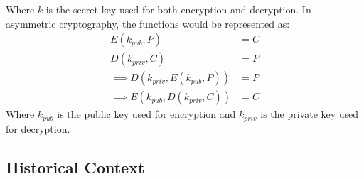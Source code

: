 \documentclass[openany]{book}
\begin{document}
Where \( k \) is the secret key used for both encryption and decryption. In asymmetric cryptography, the functions would be represented as:
\begin{align*}
    E(k_{pub}, P) &= C \\
    D(k_{priv}, C) &= P \\ 
    \implies D(k_{priv}, E(k_{pub}, P)) &= P \\
    \implies E(k_{pub}, D(k_{priv}, C)) &= C
\end{align*}
Where \( k_{pub} \) is the public key used for encryption and \( k_{priv} \) is the private key used for decryption. \\
\subsection{Historical Context}
\end{document}
